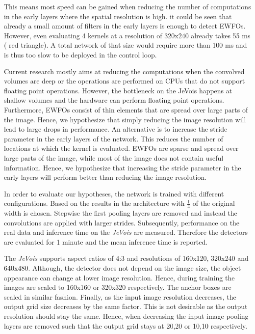 This means most speed can be gained when reducing the number of computations in the early layers where the spatial resolution is high.  it could be seen that already a small amount of filters in the early layers is enough to detect \acp{EWFO}. However, even evaluating 4 kernels at a resolution of 320x240 already takes 55 ms ( red triangle). A total network of that size would require more than 100 ms and is thus too slow to be deployed in the control loop.

Current research mostly aims at reducing the computations when the convolved volumes are deep or the operations are performed on \acp{CPU} that do not support floating point operations. However, the bottleneck on the JeVois happens at shallow volumes and the hardware can perform floating point operations. Furthermore, \acp{EWFO} consist of thin elements that are spread over large parts of the image. Hence, we hypothesize that simply reducing the image resolution will lead to large drops in performance. An alternative is to increase the stride parameter in the early layers of the network. This reduces the number of locations at which the kernel is evaluated. \acp{EWFO} are sparse and spread over large parts of the image, while most of the image does not contain useful information. Hence, we hypothesize that increasing the stride parameter in the early layers will perform better than reducing the image resolution.

In order to evaluate our hypotheses, the network is trained with different configurations. Based on the results in  the architecture with $\frac{1}{4}$ of the original width is chosen. Stepwise the first pooling layers are removed and instead the convolutions are applied with larger strides. Subsequently, performance on the real data and inference time on the \textit{JeVois} are measured. Therefore the detectors are evaluated for 1 minute and the mean inference time is reported.

The \textit{JeVois} supports aspect ratios of 4:3 and resolutions of 160x120, 320x240 and 640x480. Although, the detector does not depend on the image size, the object appearance can change at lower image resolution. Hence, during training the images are scaled to 160x160 or 320x320 respectively. The anchor boxes are scaled in similar fashion. Finally, as the input image resolution decreases, the output grid size decreases by the same factor. This is not desirable as the output resolution should stay the same. Hence, when decreasing the input image pooling layers are removed such that the output grid stays at 20,20 or 10,10 respectively.


